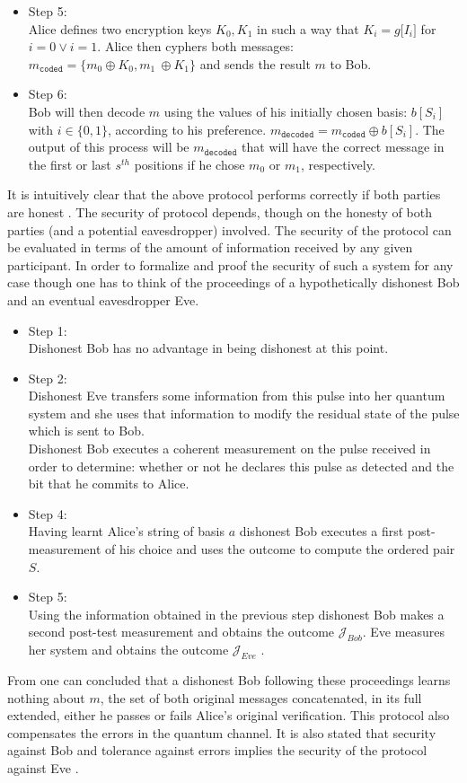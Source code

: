\begin{refsection}
\begin{itemize}
		\item Step 5:\\
		Alice defines two encryption keys $K_0,K_1$ in such a way that $K_i=g\big[I_i\big]$ for $i=0 \vee i=1$. Alice then cyphers both messages: $m_{\mathtt{coded}}=\{m_0\oplus K_0,m_1\ \oplus K_1\}$ and sends the result $m$ to Bob.
		\item Step 6:\\
		Bob will then decode $m$ using the values of his initially chosen basis:  $b\left[S_i\right]$ with $i\in\{0,1\}$, according to his preference. $m_{\mathtt{decoded}}=m_{\mathtt{coded}}\oplus b\left[S_i\right]$. The output of this process will be $m_{\mathtt{decoded}}$ that will have the correct message in the first or last $s^{th}$ positions if he chose $m_0$ or $m_1$, respectively.
	\end{itemize}
	It is intuitively clear that the above protocol performs correctly if both parties are honest \cite{Yao1995}. The security of protocol depends, though on the honesty of both parties (and a potential eavesdropper) involved. The security of the protocol can be evaluated in terms of the amount of information received by any given participant. In order to formalize and proof the security of such a system for any case though one has to think of the proceedings of a hypothetically dishonest Bob and an eventual eavesdropper Eve.
	\begin{itemize}
		\item Step 1:\\
		Dishonest Bob has no advantage in being dishonest at this point.
		\item Step 2:\\
		Dishonest Eve transfers some information from this pulse into her quantum system and she uses that information to modify the residual state of the pulse which is sent to Bob.\\
		Dishonest Bob executes a coherent measurement on the pulse received in order to determine: whether or not he declares this pulse as detected and the bit that he commits to Alice.
		\item Step 4:\\
		Having learnt Alice's string of basis $a$ dishonest Bob executes a first post-measurement of his choice and uses the outcome to compute the ordered pair $S$.
		\item Step 5:\\ Using the information obtained in the previous step dishonest Bob makes a second post-test measurement and obtains the outcome $\mathcal{J}_{Bob}$. Eve measures her system and obtains the outcome $\mathcal{J}_{Eve}$ \cite{Mayers}.
	\end{itemize}
	From \cite{Mayers} one can concluded that a dishonest Bob following these proceedings learns nothing about $m$, the set of both original messages concatenated, in its full extended, either he passes or fails Alice's original verification. This protocol also compensates the errors in the quantum channel. It is also stated that security against Bob and tolerance against errors implies the security of the protocol against Eve \cite{Mayers}.
 


\end{refsection}
